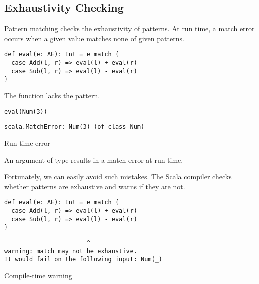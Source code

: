 \subsection{Exhaustivity Checking}

Pattern matching checks the exhaustivity of patterns. At run time, a match error
occurs when a given value matches none of given patterns.

\begin{verbatim}
def eval(e: AE): Int = e match {
  case Add(l, r) => eval(l) + eval(r)
  case Sub(l, r) => eval(l) - eval(r)
}
\end{verbatim}

The function lacks the  pattern.

\begin{verbatim}
eval(Num(3))
\end{verbatim}
\vspace{-1em}
\begin{mdframed}[hidealllines=true,backgroundcolor=gray!10,innerleftmargin=3pt,innerrightmargin=3pt,leftmargin=-3pt,rightmargin=-3pt]
\begin{verbatim}
scala.MatchError: Num(3) (of class Num)
\end{verbatim}
\vspace{-2em}
\begin{flushright}
\scriptsize\textsf{Run-time error}
\end{flushright}
\end{mdframed}

An argument of type  results in a match error at run time.

Fortunately, we can easily avoid such mistakes.
The Scala compiler checks whether patterns are exhaustive and warns if they are not.

\begin{verbatim}
def eval(e: AE): Int = e match {
  case Add(l, r) => eval(l) + eval(r)
  case Sub(l, r) => eval(l) - eval(r)
}
\end{verbatim}
\vspace{-1em}
\begin{mdframed}[hidealllines=true,backgroundcolor=gray!10,innerleftmargin=3pt,innerrightmargin=3pt,leftmargin=-3pt,rightmargin=-3pt]
\begin{verbatim}
                       ^
warning: match may not be exhaustive.
It would fail on the following input: Num(_)
\end{verbatim}
\vspace{-2em}
\begin{flushright}
\scriptsize\textsf{Compile-time warning}
\end{flushright}
\end{mdframed}

